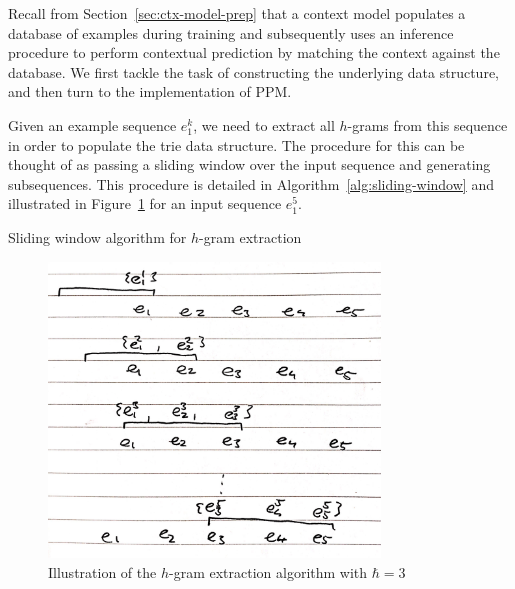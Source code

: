 \documentclass[12pt,a4paper,twoside,openright]{report}
\begin{document}
Recall from Section~\ref{sec:ctx-model-prep} that a context model populates a
database of examples during training and subsequently uses an inference
procedure to perform contextual prediction by matching the context against the
database. We first tackle the task of constructing the underlying data
structure, and then turn to the implementation of PPM.

Given an example sequence $e_1^k$, we need to extract all $h$-grams from this
sequence in order to populate the trie data structure. The procedure for this
can be thought of as passing a sliding window over the input sequence and
generating subsequences. This procedure is detailed in
Algorithm~\ref{alg:sliding-window} and illustrated in
Figure~\ref{fig:hgram-extract} for an input sequence $e_1^5$.

\vspace{4mm}

\begin{algorithm}[H]
  \caption{Sliding window algorithm for $h$-gram extraction}
  \label{alg:sliding-window}
  \begin{algorithmic}[1]
        \State {}
         
        \EndFor
      \EndFor
    \EndFunction
  \end{algorithmic}
\end{algorithm}

\begin{figure}[H]
\centering
\includegraphics[width=250pt]{figs/sliding_window_tmp.jpg}
\caption{Illustration of the $h$-gram extraction algorithm with $\hbar = 3$}
\label{fig:hgram-extract}
\end{figure}
\end{document}
